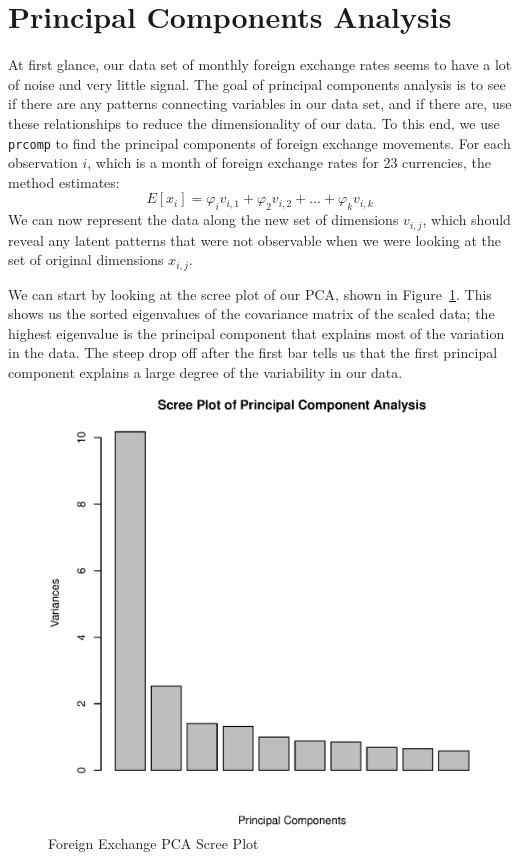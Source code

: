\documentclass[11pt, fleqn]{article}
\begin{document}
\section{Principal Components Analysis} \label{sec:pca}

At first glance, our data set of monthly foreign exchange rates seems to have a lot of noise and very little signal. The goal of principal components analysis is to see if there are any patterns connecting variables in our data set, and if there are, use these relationships to reduce the dimensionality of our data. To this end, we use \texttt{prcomp} to find the principal components of foreign exchange movements. For each observation $i$, which is a month of foreign exchange rates for 23 currencies, the method estimates:
\begin{equation}
E[x_i] = \varphi_i v_{i,1} + \varphi_2 v_{i,2} + ... + \varphi_k v_{i,k}
\end{equation}
We can now represent the data along the new set of dimensions $v_{i,j}$, which should reveal any latent patterns that were not observable when we were looking at the set of original dimensions $x_{i,j}$.

We can start by looking at the scree plot of our PCA, shown in Figure~\ref{fig:screeplot}. This shows us the sorted eigenvalues of the covariance matrix of the scaled data; the highest eigenvalue is the principal component that explains most of the variation in the data. The steep drop off after the first bar tells us that the first principal component explains a large degree of the variability in our data.

\begin{figure}[!htb]
  \centering
  \includegraphics[scale=.5]{screeplot.eps}
  \caption{Foreign Exchange PCA Scree Plot}
  \label{fig:screeplot}
\end{figure} 
\end{document}
